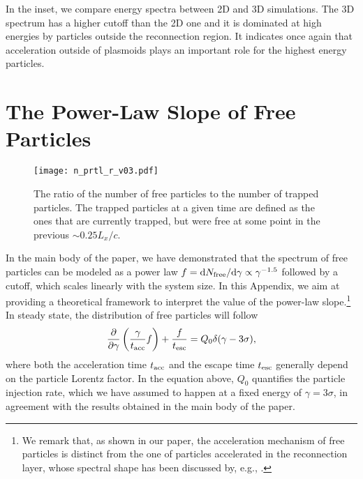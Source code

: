 \documentclass[twocolumn,twocolappendix]{aastex63}
\begin{document}
In the inset, we compare energy spectra between 2D and 3D simulations. The 3D spectrum has a higher cutoff than the 2D one and it is dominated at high energies by particles outside the reconnection region. It indicates once again that  acceleration outside of plasmoids plays an important role for the highest energy particles. 


\section{The Power-Law Slope of Free Particles}\label{slope}

\begin{figure}
    \texttt{[image: n\_prtl\_r\_v03.pdf]}
    \caption{The ratio of the number of free particles to the number of trapped particles. The trapped particles at a given time are defined as the ones that are currently trapped, but were free at some point in the previous $\sim 0.25 L_x/c$.
    }
    \label{fig:ratio_n_free_n_trap}
\end{figure}

In the main body of the paper, we have demonstrated that the spectrum of free particles can be modeled as a power law $f={\rm d} N_{\rm free}/{\rm d} \gamma\propto \gamma^{-1.5}$ followed by a cutoff, which scales linearly with the system size. In this Appendix, we aim at providing a theoretical framework to interpret the value of the power-law slope.\footnote{We remark that, as shown in our paper, the acceleration mechanism of free particles is distinct from the one of particles accelerated in the reconnection layer, whose spectral shape has been discussed by, e.g., \citet{guo_14,uzdensky_20}.} In steady state, the distribution of free particles will follow 
\begin{equation}\label{eq:fp}
    \frac{\partial}{\partial \gamma} \left(\frac{\gamma}{t_{\rm acc}}f\right) + \frac{f}{t_{\rm esc}} = Q_0 \delta(\gamma-3 \sigma),
\end{equation}
where both the acceleration time $t_{\rm acc}$ and the escape time $t_{\rm esc}$ generally depend on the particle Lorentz factor. In the equation above, $Q_0$ quantifies the particle injection rate, which we have assumed to happen at a fixed energy of $\gamma=3\sigma$, in agreement with the results obtained in the main body of the paper.
\end{document}

